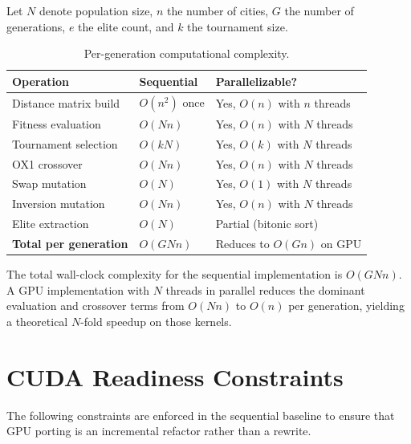 \documentclass[11pt, letterpaper]{article}
\begin{document}
Let $N$ denote population size, $n$ the number of cities, $G$ the number of
generations, $e$ the elite count, and $k$ the tournament size.

\begin{table}[h]
\centering
\caption{Per-generation computational complexity.}
\label{tab:complexity}
\renewcommand{\arraystretch}{1.35}
\begin{tabular}{@{} l l l @{}}
\toprule
\textbf{Operation} & \textbf{Sequential} & \textbf{Parallelizable?} \\
\midrule
Distance matrix build  & $O(n^2)$ once   & Yes, $O(n)$ with $n$ threads \\
Fitness evaluation     & $O(Nn)$         & Yes, $O(n)$ with $N$ threads \\
Tournament selection   & $O(kN)$         & Yes, $O(k)$ with $N$ threads \\
OX1 crossover          & $O(Nn)$         & Yes, $O(n)$ with $N$ threads \\
Swap mutation          & $O(N)$          & Yes, $O(1)$ with $N$ threads \\
Inversion mutation     & $O(Nn)$         & Yes, $O(n)$ with $N$ threads \\
Elite extraction       & $O(N)$          & Partial (bitonic sort) \\
\midrule
\textbf{Total per generation} & $O(GNn)$ & Reduces to $O(Gn)$ on GPU \\
\bottomrule
\end{tabular}
\end{table}

The total wall-clock complexity for the sequential implementation is $O(G N n)$.
A GPU implementation with $N$ threads in parallel reduces the dominant
evaluation and crossover terms from $O(Nn)$ to $O(n)$ per generation,
yielding a theoretical $N$-fold speedup on those kernels.

\section{CUDA Readiness Constraints}

The following constraints are enforced in the sequential baseline to ensure
that GPU porting is an incremental refactor rather than a rewrite.
\end{document}
